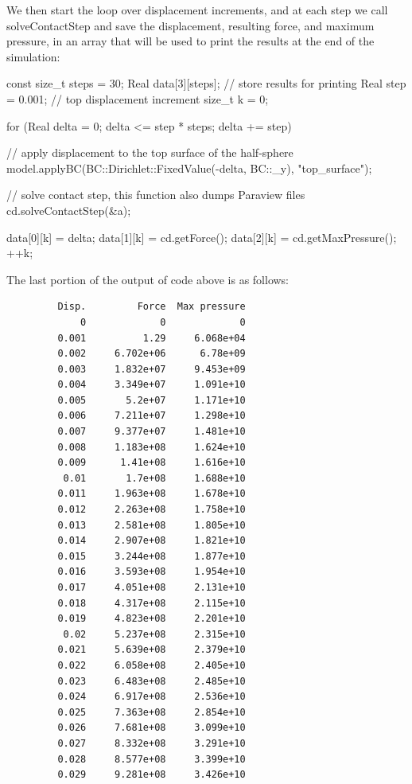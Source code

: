 We then start the loop over displacement increments, and at each step we call {{{solveContactStep}}} and save the displacement, resulting force, and maximum pressure, in an array that will be used to print the results at the end of the simulation:
\begin{cpp}

  const size_t steps = 30;
  Real data[3][steps]; // store results for printing
  Real step = 0.001;  // top displacement increment
  size_t k = 0;

  for (Real delta = 0; delta <= step * steps; delta += step) {
    // apply displacement to the top surface of the half-sphere
    model.applyBC(BC::Dirichlet::FixedValue(-delta, BC::_y), "top_surface");

    // solve contact step, this function also dumps Paraview files
    cd.solveContactStep(&a);

    data[0][k] = delta;
    data[1][k] = cd.getForce();
    data[2][k] = cd.getMaxPressure();
    ++k;
  }
\end{cpp}


The last portion of the output of code above is as follows:
\begin{verbatim}
         Disp.         Force  Max pressure
             0             0             0
         0.001          1.29     6.068e+04
         0.002     6.702e+06      6.78e+09
         0.003     1.832e+07     9.453e+09
         0.004     3.349e+07     1.091e+10
         0.005       5.2e+07     1.171e+10
         0.006     7.211e+07     1.298e+10
         0.007     9.377e+07     1.481e+10
         0.008     1.183e+08     1.624e+10
         0.009      1.41e+08     1.616e+10
          0.01       1.7e+08     1.688e+10
         0.011     1.963e+08     1.678e+10
         0.012     2.263e+08     1.758e+10
         0.013     2.581e+08     1.805e+10
         0.014     2.907e+08     1.821e+10
         0.015     3.244e+08     1.877e+10
         0.016     3.593e+08     1.954e+10
         0.017     4.051e+08     2.131e+10
         0.018     4.317e+08     2.115e+10
         0.019     4.823e+08     2.201e+10
          0.02     5.237e+08     2.315e+10
         0.021     5.639e+08     2.379e+10
         0.022     6.058e+08     2.405e+10
         0.023     6.483e+08     2.485e+10
         0.024     6.917e+08     2.536e+10
         0.025     7.363e+08     2.854e+10
         0.026     7.681e+08     3.099e+10
         0.027     8.332e+08     3.291e+10
         0.028     8.577e+08     3.399e+10
         0.029     9.281e+08     3.426e+10
\end{verbatim}

